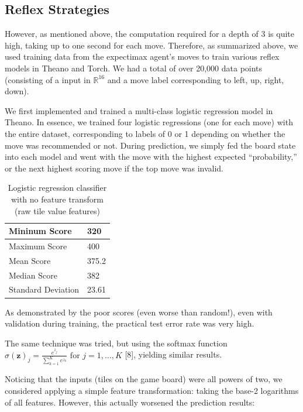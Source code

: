 \documentclass[9pt,twocolumn]{article}
\begin{document}
\subsection{Reflex Strategies}

However, as mentioned above, the computation required for a depth of 3 is quite high, taking up to one second for each move. Therefore, as summarized above, we used training data from the expectimax agent’s moves to train various reflex models in Theano and Torch. We had a total of over 20,000 data points (consisting of a input in $\mathbb{R}^{16}$ and a move label corresponding to left, up, right, down).

We first implemented and trained a multi-class logistic regression model in Theano. In essence, we trained four logistic regressions (one for each move) with the entire dataset, corresponding to labels of 0 or 1 depending on whether the move was recommended or not. During prediction, we simply fed the board state into each model and went with the move with the highest expected “probability,” or the next highest scoring move if the top move was invalid.

\begin{table}[!htbp]

\centering

\begin{tabular}{|l|l|}
\hline
Mininum Score      & 320 \\ \hline
Maximum Score      & 400 \\ \hline
Mean Score         & 375.2 \\ \hline
Median Score       & 382 \\ \hline
Standard Deviation & 23.61 \\ \hline
\end{tabular}

\caption{Logistic regression classifier with no feature transform (raw tile value features)}

\end{table}

As demonstrated by the poor scores (even worse than random!), even with validation during training, the practical test error rate was very high.

The same technique was tried, but using the softmax function $\sigma(\mathbf{z})_j = \frac{e^{z_j}}{\sum_{k=1}^K e^{z_k}} \text{ for } j = 1, \dots, K$ [8], yielding similar results.

Noticing that the inputs (tiles on the game board) were all powers of two, we considered applying a simple feature transformation: taking the base-2 logarithms of all features. However, this actually worsened the prediction results:
\end{document}
